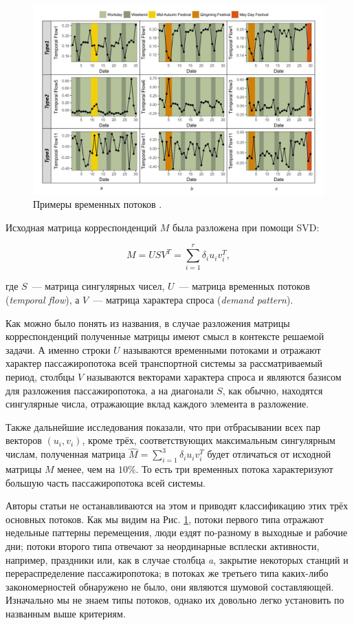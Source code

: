 \documentclass[12pt, fleqn, titlepage]{article}
\begin{document}
    \begin{figure}[ht]
        \centering
        \includegraphics[scale=0.5]{pics/flows.png}
        \caption{Примеры временных потоков \cite{duan2018understanding}.}
        \label{flows}
    \end{figure}

    Исходная матрица корреспонденций $M$ была разложена при помощи SVD:

    $$
    M = USV^T = \sum_{i = 1}^r \delta_i u_i v^T_i,
    $$

    где $S$~--- матрица сингулярных чисел, $U$~--- матрица временных потоков (\textit{temporal flow}), а $V$~--- 
    матрица характера спроса (\textit{demand pattern}). 

    Как можно было понять из названия, в случае разложения матрицы корреспонденций полученные матрицы имеют смысл 
    в контексте решаемой задачи. А именно строки $U$ называются временными потоками и отражают характер пассажиропотока 
    всей транспортной системы за рассматриваемый период, столбцы $V$ называются векторами характера спроса и являются базисом для 
    разложения пассажиропотока, а на диагонали $S$, как обычно, находятся сингулярные числа, отражающие вклад 
    каждого элемента в разложение.

    Также дальнейшие исследования показали, что при отбрасывании всех пар векторов $(u_i, v_i)$, кроме трёх, соответствующих 
    максимальным сингулярным числам, полученная матрица $\hat{M} = \sum_{i = 1}^3 \delta_i u_i v^T_i$ будет отличаться от исходной 
    матрицы $M$ менее, чем на $10\%$. То есть три временных потока характеризуют большую часть пассажиропотока всей системы. 

    Авторы статьи не останавливаются на этом и приводят классификацию этих трёх основных потоков. Как мы видим на Рис. \ref{flows}, 
    потоки первого типа отражают недельные паттерны перемещения, люди ездят по-разному в выходные и рабочие дни; потоки второго типа 
    отвечают за неординарные всплески активности, например, праздники или, как в случае столбца \textit{a}, закрытие некоторых 
    станций и перераспределение пассажиропотока; в потоках же третьего типа каких-либо закономерностей обнаружено не было, они являются 
    шумовой составляющей. Изначально мы не знаем типы потоков, однако их довольно легко установить по названным выше критериям. 
    
\end{document}
